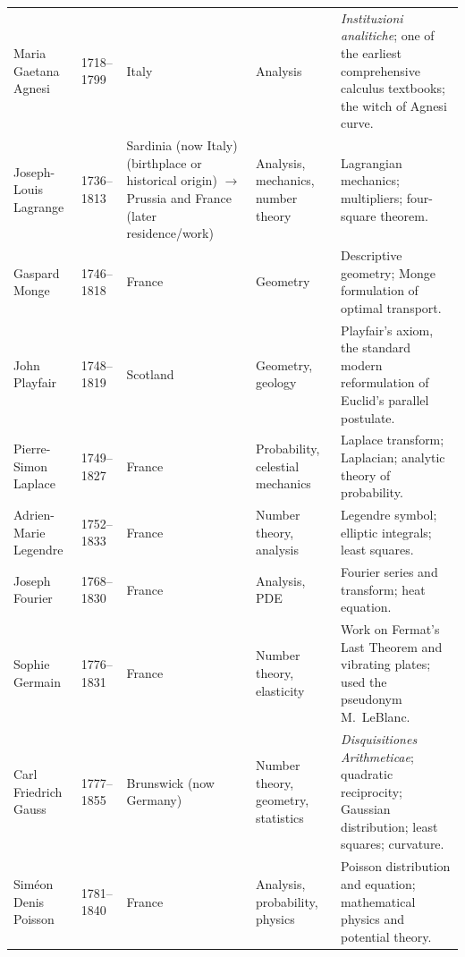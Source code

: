 {\begin{longtable}{@{}L{0.145\textwidth}L{0.09\textwidth}L{0.225\textwidth}L{0.14\textwidth}L{0.30\textwidth}@{}}
        Maria Gaetana Agnesi
        & 1718--1799
        & Italy
        & Analysis
        & \textit{Instituzioni analitiche}; one of the earliest comprehensive
          calculus textbooks; the witch of Agnesi curve. \\

        Joseph-Louis Lagrange
        & 1736--1813
        & Sardinia (now Italy) (birthplace or historical origin) \(\to\) Prussia and France (later residence/work)
        & Analysis, mechanics, number theory
        & Lagrangian mechanics; multipliers; four-square theorem. \\

        Gaspard Monge
        & 1746--1818
        & France
        & Geometry
        & Descriptive geometry; Monge formulation of optimal transport. \\

        John Playfair
        & 1748--1819
        & Scotland
        & Geometry, geology
        & Playfair's axiom, the standard modern reformulation of Euclid's
          parallel postulate. \\

        Pierre-Simon Laplace
        & 1749--1827
        & France
        & Probability, celestial mechanics
        & Laplace transform; Laplacian; analytic theory of probability. \\

        Adrien-Marie Legendre
        & 1752--1833
        & France
        & Number theory, analysis
        & Legendre symbol; elliptic integrals; least squares. \\

        Joseph Fourier
        & 1768--1830
        & France
        & Analysis, PDE
        & Fourier series and transform; heat equation. \\

        Sophie Germain
        & 1776--1831
        & France
        & Number theory, elasticity
        & Work on Fermat's Last Theorem and vibrating plates; used the
          pseudonym M.\ LeBlanc. \\

        Carl Friedrich Gauss
        & 1777--1855
        & Brunswick (now Germany)
        & Number theory, geometry, statistics
        & \textit{Disquisitiones Arithmeticae}; quadratic reciprocity; Gaussian
          distribution; least squares; curvature. \\

        Siméon Denis Poisson
        & 1781--1840
        & France
        & Analysis, probability, physics
        & Poisson distribution and equation; mathematical physics and potential
          theory. \\


\end{longtable}}
